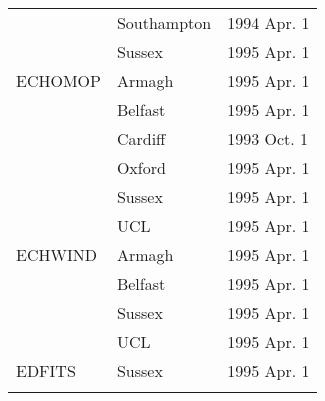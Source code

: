 \begin{table}
\begin{center}
\begin{tabular}{|p{36mm}|p{50mm}|p{30mm}|}
                        & Southampton      & 1994 Apr. 1 \\
                        & Sussex           & 1995 Apr. 1 \\
ECHOMOP                 & Armagh           & 1995 Apr. 1 \\
                        & Belfast          & 1995 Apr. 1 \\
                        & Cardiff          & 1993 Oct. 1 \\
                        & Oxford           & 1995 Apr. 1 \\
                        & Sussex           & 1995 Apr. 1 \\
                        & UCL              & 1995 Apr. 1 \\
ECHWIND                 & Armagh           & 1995 Apr. 1 \\
                        & Belfast          & 1995 Apr. 1 \\
                        & Sussex           & 1995 Apr. 1 \\
                        & UCL              & 1995 Apr. 1 \\
EDFITS                  & Sussex           & 1995 Apr. 1 \\
& & \\ \hline                   
\end{tabular}
\end{center}
\end{table}

